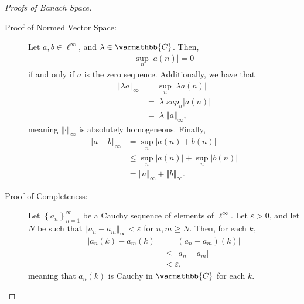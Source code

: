 \documentclass[10pt]{extarticle}
\newcommand{\C}{\mathbb{C}}
\newcommand{\norm}[1]{\left\Vert #1\right\Vert}
\newcommand{\set}[1]{\left\{#1\right\}}
\newcommand{\ve}{\varepsilon}
\theoremstyle{plain}
\theoremstyle{definition}
\theoremstyle{note}
\renewcommand*{\mathbb}[1]{\varmathbb{#1}}
\renewcommand{\newline}{\hfill\break}
\begin{document}
\begin{proof}[Proofs of Banach Space]\hfill
  \begin{description}[font = \normalfont]
    \item[$\ell^{\infty}$:]\hfill
      \begin{description}
        \item[Proof of Normed Vector Space:] Let $a,b\in \ell^{\infty}$, and $\lambda \in \C$. Then,
          \begin{align*}
            \sup_{n}|a(n)| = 0
          \end{align*}
          if and only if $a$ is the zero sequence. Additionally, we have that
          \begin{align*}
            \norm{\lambda a}_{\infty} &= \sup_{n}\left\vert \lambda a(n) \right\vert\\
                             &= |\lambda|sup_{n}|a(n)|\\
                             &= |\lambda|\norm{a}_{\infty},
          \end{align*}
          meaning $\norm{\cdot}_{\infty}$ is absolutely homogeneous. Finally,
          \begin{align*}
            \norm{a + b}_{\infty} &= \sup_{n}\left\vert a(n) + b(n) \right\vert\\
                         &\leq \sup_{n}\left\vert a(n) \right\vert + \sup_{n}\left\vert b(n) \right\vert\\
                         &= \norm{a}_{\infty} + \norm{b}_{\infty}.
          \end{align*}
        \item[Proof of Completeness:] Let $\set{a_n}_{n=1}^{\infty}$ be a Cauchy sequence of elements of $\ell^{\infty}$. Let $\ve > 0$, and let $N$ be such that $\norm{a_n - a_m}_{\infty} < \varepsilon$ for $n,m \geq N$. Then, for each $k$,
          \begin{align*}
            \left\vert a_{n}(k) - a_m(k) \right\vert &= \left\vert (a_n - a_m)(k) \right\vert\\
                                                     &\leq \norm{a_n - a_m}\\
                                                     &< \varepsilon,
          \end{align*}
          meaning that $a_n(k)$ is Cauchy in $\C$ for each $k$.\newline


\end{description}
\end{description}
\end{proof}
\end{document}
